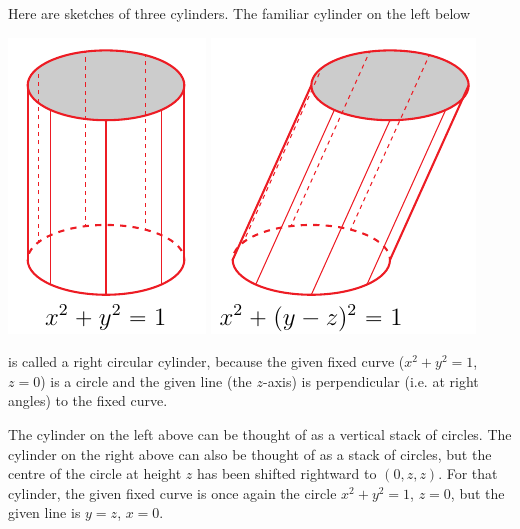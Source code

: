 \begin{eg}\label{eg cylinders}
Here are sketches of three cylinders.
The familiar cylinder on the left below
\begin{efig}
\begin{center}
   \includegraphics{cylinderR.pdf}\qquad
   \includegraphics{cylinderO.pdf}
\end{center}
\end{efig}
is called a right circular cylinder, because the given fixed curve
($x^2+y^2=1$, $z=0$)
is a circle and the given line (the $z$-axis) is perpendicular 
(i.e. at right angles) to the fixed curve.

The cylinder on the left above can be thought of as a vertical stack of 
circles. The cylinder on the right above can also be thought of as a stack 
of circles, but the centre of the circle at height $z$ has been shifted
rightward to $(0,z,z)$. For that cylinder, the given fixed curve 
is once again the circle $x^2+y^2=1$, $z=0$, but the given line is $y=z$, $x=0$.


\end{eg}
